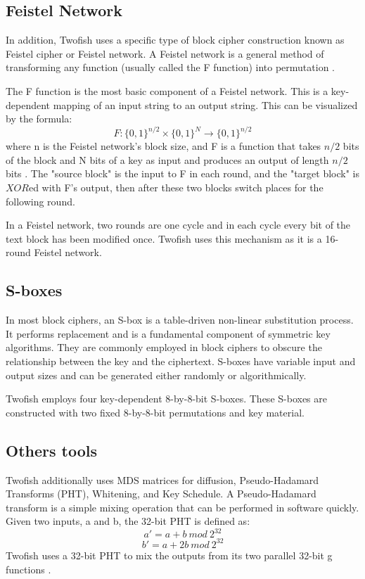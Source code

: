 \documentclass[11pt]{article}
\begin{document}
\subsection{Feistel Network}
In addition, Twofish uses a specific type of block cipher construction known as Feistel cipher or Feistel network. A Feistel network is a general method of transforming any function (usually called the F function) into permutation \cite{schneier1999twofish}. 

The F function is the most basic component of a Feistel network. This is a key-dependent mapping of an input string to an output string. This can be visualized by the formula:
\begin{equation}
F : \{0, 1\}^{n/2} \times \{0, 1\}^N \to \{0, 1\}^{n/2}
\end{equation}
where n is the Feistel network's block size, and F is a function that takes \(n/2\) bits of the block and N bits of a key as input and produces an output of length \(n/2\) bits \cite{schneier1999twofish}. The "source block" is the input to F in each round, and the "target block" is \(XOR\)ed with F's output, then after these two blocks switch places for the following round. 

In a Feistel network, two rounds are one cycle and in each cycle every bit of the text block has been modified once. Twofish uses this mechanism as it is a 16-round Feistel network.

\subsection{S-boxes}

In most block ciphers, an S-box is a table-driven non-linear substitution process. It performs replacement and is a fundamental component of symmetric key algorithms. They are commonly employed in block ciphers to obscure the relationship between the key and the ciphertext. S-boxes have variable input and output sizes and can be generated either randomly or algorithmically. 

Twofish employs four key-dependent 8-by-8-bit S-boxes. These S-boxes are constructed with two fixed 8-by-8-bit permutations and key material.

\subsection{Others tools}

Twofish additionally uses MDS matrices for diffusion, Pseudo-Hadamard Transforms (PHT), Whitening, and Key Schedule. A Pseudo-Hadamard transform is a simple mixing operation that can be performed in software quickly. Given two inputs, a and b, the 32-bit PHT is defined as:
\begin{equation}
a' = a + b\ mod\ 2^{32}
\end{equation}
\begin{equation}
b' = a + 2b\ mod\ 2^{32}
\end{equation}
Twofish uses a 32-bit PHT to mix the outputs from its two parallel 32-bit g functions \cite{schneier1999twofish}.
\end{document}
